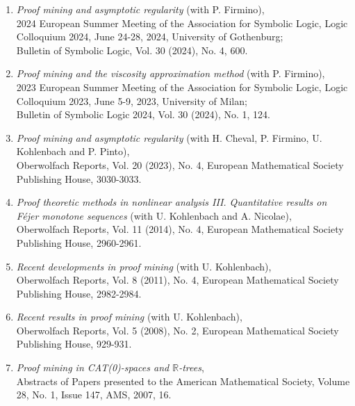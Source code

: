 \documentclass[12pt]{article}
\begin{document}
\begin{enumerate}

\item {\em Proof mining and asymptotic regularity} (with P. Firmino), \\
2024 European Summer Meeting of the Association for Symbolic Logic, Logic Colloquium 2024, June 24-28, 2024, University of Gothenburg; \\
Bulletin of Symbolic Logic,  Vol. 30 (2024), No. 4, 600.\\

\item {\em Proof mining and the viscosity approximation method} (with P. Firmino), \\
2023 European Summer Meeting of the Association for Symbolic Logic, Logic Colloquium 2023, June 5-9, 2023, University of Milan; \\
Bulletin of Symbolic Logic 2024,  Vol. 30 (2024),  No. 1, 124.\\

\item {\em Proof mining and asymptotic regularity} (with H. Cheval, P. Firmino, U. Kohlenbach and P. Pinto),\\
Oberwolfach Reports, Vol. 20 (2023), No.  4, European Mathematical Society Publishing House, 3030-3033.

\item {\em Proof theoretic methods in nonlinear analysis III. Quantitative results on F\'ejer monotone sequences} (with U. Kohlenbach and A. Nicolae),\\
Oberwolfach Reports, Vol. 11 (2014), No. 4, European Mathematical Society Publishing House, 2960-2961.

\item {\em Recent developments in proof mining} (with U. Kohlenbach),\\
Oberwolfach Reports, Vol. 8 (2011), No. 4, European Mathematical Society Publishing House, 2982-2984.

\item {\em Recent results in proof mining} (with U. Kohlenbach),\\
Oberwolfach Reports, Vol. 5 (2008), No.  2, European Mathematical Society Publishing House, 929-931.

\item {\em Proof mining in CAT(0)-spaces and ${\mathbb R}$-trees}, \\
Abstracts of Papers presented to the American Mathematical Society, Volume 28, No. 1, Issue 147, AMS, 2007, 16.


\end{enumerate}
\end{document}

